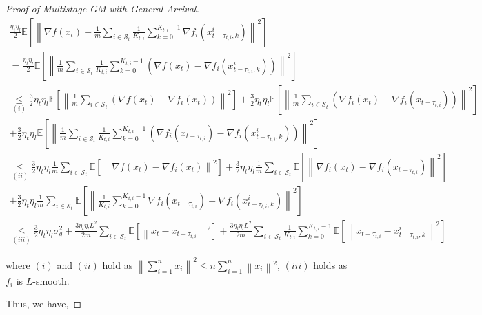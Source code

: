 \begin{proof}[Proof of Multistage GM with General Arrival]
\begin{equation}
\begin{gathered}
\frac{\eta_t\eta_l}{2} \mathbb{E}\left[\left\| \nabla f(x_t) - \frac{1}{m}\sum_{i\in\mathcal{S}_t} \frac{1}{K_{t,i}} \sum_{k=0}^{K_{t,i}-1}  \nabla f_i(x_{t-\tau_{t,i},k}^i) \right\|^2\right] \\
= \frac{\eta_t\eta_l}{2} \mathbb{E}\left[\left\| \frac{1}{m}\sum_{i\in\mathcal{S}_t} \frac{1}{K_{t,i}} \sum_{k=0}^{K_{t,i}-1} \left( \nabla f(x_t)  -\nabla f_i(x_{t-\tau_{t,i},k}^i) \right) \right\|^2\right]\\
\underset{(i)}{\leq} \frac{3}{2} \eta_t\eta_l \mathbb{E}\left[\left\| \frac{1}{m}\sum_{i\in\mathcal{S}_t} \left( \nabla f(x_t)  -\nabla f_i(x_t) \right) \right\|^2\right] + \frac{3}{2} \eta_t\eta_l \mathbb{E}\left[\left\| \frac{1}{m}\sum_{i\in\mathcal{S}_t} \left( \nabla f_i(x_t)  -\nabla f_i(x_{t-\tau_{t,i}}) \right) \right\|^2\right] \\
+ \frac{3}{2} \eta_t\eta_l \mathbb{E}\left[\left\| \frac{1}{m}\sum_{i\in\mathcal{S}_t} \frac{1}{K_{t,i}} \sum_{k=0}^{K_{t,i}-1} \left( \nabla f_i(x_{t-\tau_{t,i}}) - \nabla f_i(x_{t-\tau_{t,i},k}^i) \right) \right\|^2\right]\\
\underset{(ii)}{\leq}  \frac{3}{2} \eta_t\eta_l \frac{1}{m}\sum_{i\in\mathcal{S}_t} \mathbb{E}\left[\left\|    \nabla f(x_t)  -\nabla f_i(x_t)   \right\|^2\right] + \frac{3}{2} \eta_t\eta_l \frac{1}{m}\sum_{i\in\mathcal{S}_t} \mathbb{E}\left[\left\|    \nabla f_i(x_t)  -\nabla f_i(x_{t-\tau_{t,i}})   \right\|^2\right] \\
+ \frac{3}{2} \eta_t\eta_l \frac{1}{m}\sum_{i\in\mathcal{S}_t} \mathbb{E}\left[\left\|  \frac{1}{K_{t,i}} \sum_{k=0}^{K_{t,i}-1}   \nabla f_i(x_{t-\tau_{t,i}}) - \nabla f_i(x_{t-\tau_{t,i},k}^i)  \right\|^2\right]\\
\underset{(iii)}{\leq} \frac{3}{2} \eta_t\eta_l \sigma_g^2 +  \frac{3\eta_t\eta_l L^2}{2m} \sum_{i\in\mathcal{S}_t} \mathbb{E}\left[\left\|  x_t  - x_{t-\tau_{t,i}} \right\|^2\right] + \frac{3 \eta_t \eta_l L^2}{2 m} \sum_{i\in\mathcal{S}_t} \frac{1}{K_{t,i}} \sum_{k=0}^{K_{t,i}-1} \mathbb{E}\left[\left\|    x_{t-\tau_{t,i}}  -  x_{t-\tau_{t,i},k}^i \right\|^2\right]
\end{gathered}\nonumber
\end{equation}

where $(i)$ and $(ii)$ hold as $\left\|\sum_{i=1}^n x_i\right\|^2 \leq n \sum_{i=1}^n\left\| x_i \right\|^2$, $(iii)$ holds as $f_i$ is $L$-smooth.


Thus, we have, 


\end{proof}
